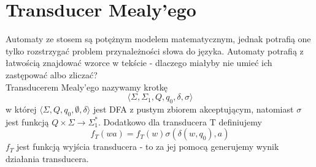 \documentclass[declaration,shortabstract]{iithesis}
\theoremstyle{definition}
\theoremstyle{plain}
\begin{document}
\section{Transducer Mealy'ego}
Automaty ze stosem są potężnym modelem matematycznym, jednak po\-tra\-fią 
one tylko rozstrzygać problem przynależności słowa do języka.
Automaty potrafią z łatwością znajdować wzorce w tekście 
- dlaczego miałyby nie umieć ich za\-stę\-po\-wać albo zliczać?\\
Transducerem Mealy'ego \cite{Mealy book} nazywamy krotkę 
$$ \langle \Sigma, \Sigma_1, Q, q_0, \delta, \sigma \rangle $$
w której \( \langle \Sigma, Q, q_0, \emptyset, \delta \rangle \) jest DFA z pustym zbiorem akceptującym, 
natomiast \(\sigma\) jest funkcją \(Q \times \Sigma \rightarrow \Sigma_1^{*} \). Dodatkowo dla transducera T definiujemy 
$$f_T(wa) = f_T(w)\sigma(\delta(w, q_0), a) $$
\(f_T\) jest funkcją wyjścia transducera - to za jej pomocą generujemy wynik działania transducera.
\end{document}
